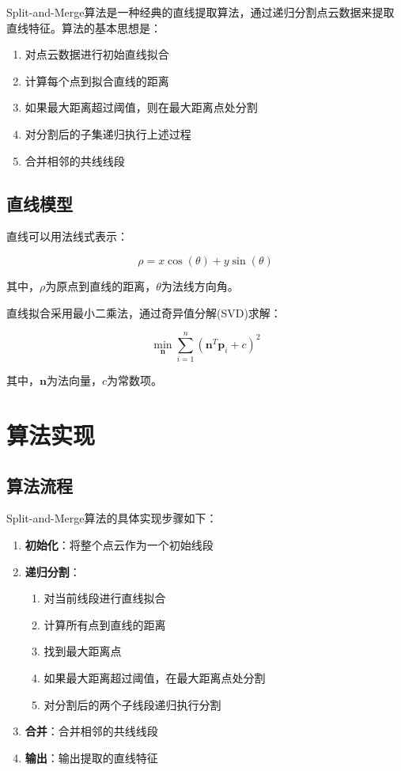 \documentclass[12pt,a4paper]{report}
\begin{document}
Split-and-Merge算法是一种经典的直线提取算法，通过递归分割点云数据来提取直线特征。算法的基本思想是：

\begin{enumerate}[itemsep=0pt]
    \item 对点云数据进行初始直线拟合
    \item 计算每个点到拟合直线的距离
    \item 如果最大距离超过阈值，则在最大距离点处分割
    \item 对分割后的子集递归执行上述过程
    \item 合并相邻的共线线段
\end{enumerate}

\subsection{直线模型}

直线可以用法线式表示：

\begin{equation}
\rho = x \cos(\theta) + y \sin(\theta)
\end{equation}

其中，$\rho$为原点到直线的距离，$\theta$为法线方向角。

直线拟合采用最小二乘法，通过奇异值分解(SVD)求解：

\begin{equation}
\min_{\mathbf{n}} \sum_{i=1}^{n} (\mathbf{n}^T \mathbf{p}_i + c)^2
\end{equation}

其中，$\mathbf{n}$为法向量，$c$为常数项。

\section{算法实现}

\subsection{算法流程}

Split-and-Merge算法的具体实现步骤如下：

\begin{enumerate}[itemsep=0pt]
    \item \textbf{初始化}：将整个点云作为一个初始线段
    \item \textbf{递归分割}：
    \begin{enumerate}[itemsep=0pt]
        \item 对当前线段进行直线拟合
        \item 计算所有点到直线的距离
        \item 找到最大距离点
        \item 如果最大距离超过阈值，在最大距离点处分割
        \item 对分割后的两个子线段递归执行分割
    \end{enumerate}
    \item \textbf{合并}：合并相邻的共线线段
    \item \textbf{输出}：输出提取的直线特征
\end{enumerate}
\end{document}
